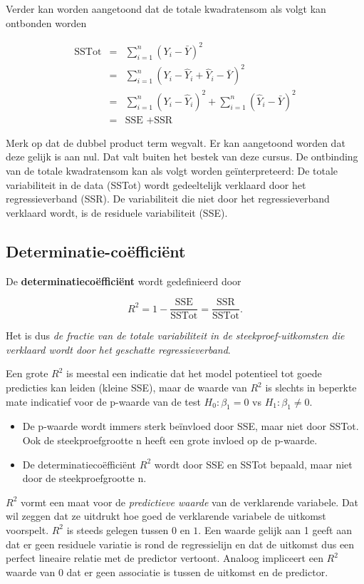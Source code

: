 \documentclass[
  dutch,
  letterpaper,
  12pt]{book}
\providecommand{\tightlist}{%
  \setlength{\itemsep}{0pt}\setlength{\parskip}{0pt}}
\theoremstyle{definition}
\theoremstyle{definition}
\theoremstyle{definition}
\theoremstyle{remark}
\begin{document}
Verder kan worden aangetoond dat de totale kwadratensom als volgt kan
ontbonden worden

\begin{eqnarray*}
  \text{SSTot}
    &=&  \sum_{i=1}^n (Y_i-\bar{Y})^2 \\
    &=&  \sum_{i=1}^n (Y_i-\hat{Y}_i+\hat{Y}_i-\bar{Y})^2 \\
    &=&  \sum_{i=1}^n (Y_i-\hat{Y}_i)^2+\sum_{i=1}^n(\hat{Y}_i-\bar{Y})^2 \\
    &=&  \text{SSE }+\text{SSR}  
\end{eqnarray*}

Merk op dat de dubbel product term wegvalt. Er kan aangetoond worden dat
deze gelijk is aan nul. Dat valt buiten het bestek van deze cursus. De
ontbinding van de totale kwadratensom kan als volgt worden
geïnterpreteerd: De totale variabiliteit in de data (SSTot) wordt
gedeeltelijk verklaard door het regressieverband (SSR). De variabiliteit
die niet door het regressieverband verklaard wordt, is de residuele
variabiliteit (SSE).

\subsection{Determinatie-coëfficiënt}\label{determinatie-couxebfficiuxebnt}

De \textbf{determinatiecoëfficiënt} wordt gedefinieerd door

\[ R^2 = 1-\frac{\text{SSE}}{\text{SSTot}}=\frac{\text{SSR}}{\text{SSTot}}.\]

Het is dus \emph{de fractie van de totale variabiliteit in de
steekproef-uitkomsten die verklaard wordt door het geschatte
regressieverband}.

Een grote \(R^2\) is meestal een indicatie dat het model potentieel tot
goede predicties kan leiden (kleine SSE), maar de waarde van \(R^2\) is
slechts in beperkte mate indicatief voor de p-waarde van de test
\(H_0:\beta_1=0\) vs \(H_1:\beta_1\neq0\).

\begin{itemize}
\tightlist
\item
  De p-waarde wordt immers sterk beïnvloed door SSE, maar niet door
  SSTot. Ook de steekproefgrootte n heeft een grote invloed op de
  p-waarde.
\item
  De determinatiecoëfficiënt \(R^2\) wordt door SSE en SSTot bepaald,
  maar niet door de steekproefgrootte n.
\end{itemize}

\(R^2\) vormt een maat voor de \emph{predictieve waarde} van de
verklarende variabele. Dat wil zeggen dat ze uitdrukt hoe goed de
verklarende variabele de uitkomst voorspelt. \(R^2\) is steeds gelegen
tussen \(0\) en \(1\). Een waarde gelijk aan 1 geeft aan dat er geen
residuele variatie is rond de regressielijn en dat de uitkomst dus een
perfect lineaire relatie met de predictor vertoont. Analoog impliceert
een \(R^2\) waarde van 0 dat er geen associatie is tussen de uitkomst en
de predictor.
\end{document}
